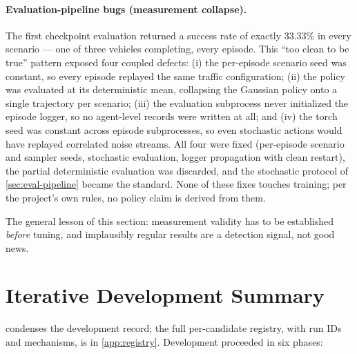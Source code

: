\paragraph{Evaluation-pipeline bugs (measurement collapse).}
The first checkpoint evaluation returned a success rate of exactly
33.33\% in every scenario --- one of three vehicles completing, every
episode. This ``too clean to be true'' pattern exposed four coupled
defects: (i) the per-episode scenario seed was constant, so every episode
replayed the same traffic configuration; (ii) the policy was evaluated at
its deterministic mean, collapsing the Gaussian policy onto a single
trajectory per scenario; (iii) the evaluation subprocess never initialized
the episode logger, so no agent-level records were written at all; and
(iv) the torch seed was constant across episode subprocesses, so even
stochastic actions would have replayed correlated noise streams. All four
were fixed (per-episode scenario and sampler seeds, stochastic
evaluation, logger propagation with clean restart), the partial
deterministic evaluation was discarded, and the stochastic protocol of
\cref{sec:eval-pipeline} became the standard. None of these fixes touches
training; per the project's own rules, no policy claim is derived from
them.

The general lesson of this section: measurement validity has to be
established \emph{before} tuning, and implausibly regular results are a
detection signal, not good news.

\section{Iterative Development Summary}
\label{sec:iterations}

 condenses the development record; the full
per-candidate registry, with run IDs and mechanisms, is in
\cref{app:registry}. Development proceeded in six phases:

